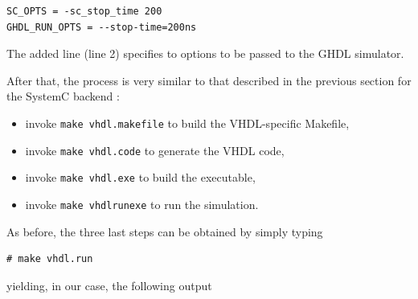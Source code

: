 \begin{lstlisting}[style=MakeStyle,caption={File
    \texttt{simple.proj} for compiling and running SystemC and VHDL code},label={lst:simple-proj-vhdl}]
SC_OPTS = -sc_stop_time 200
GHDL_RUN_OPTS = --stop-time=200ns
\end{lstlisting}

The added line (line 2) specifies to options to be passed to the GHDL simulator. 

\medskip
After that, the process is very similar to that described in the previous section for the SystemC
backend :

\begin{itemize}
\item invoke \verb|make vhdl.makefile| to build the VHDL-specific \textrm{Makefile},
\item invoke \verb|make vhdl.code| to generate the VHDL code,
\item invoke \verb|make vhdl.exe| to build the executable,
\item invoke \verb|make vhdlrunexe| to run the simulation.
\end{itemize}

As before, the three last steps can be obtained by simply typing 

\begin{lstlisting}[style=BashInputStyle]
# make vhdl.run
\end{lstlisting}

yielding, in our case, the following output 

